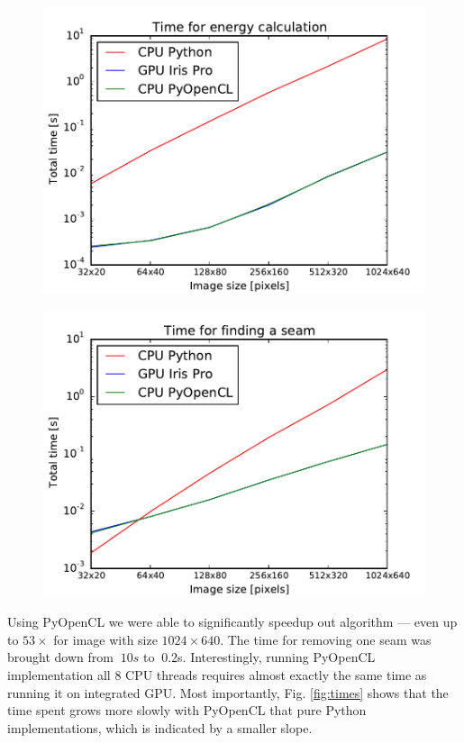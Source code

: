 \documentclass[a4paper,11pt]{article}
\begin{document}
\begin{figure}[h!]
\begin{minipage}[b]{0.48\linewidth}
\centering
\includegraphics[width=\textwidth]{../results/energy-time.pdf}
\label{fig:energy}
\end{minipage}
\hfill
\begin{minipage}[b]{0.48\linewidth}
\centering
\includegraphics[width=\textwidth]{../results/seam-time.pdf}
\label{fig:seam}
\end{minipage}
\end{figure}

Using PyOpenCL we were able to significantly speedup out algorithm — even up to $53\times$ for image with size $1024\times640$.
The time for removing one seam was brought down from $~10s$ to $~0.2$s.
Interestingly, running PyOpenCL implementation all $8$ CPU threads requires almost exactly the same time as running it on integrated GPU.
Most importantly, Fig. \ref{fig:times} shows that the time spent grows more slowly with PyOpenCL that pure Python implementations, which is indicated by a smaller slope.
\end{document}
